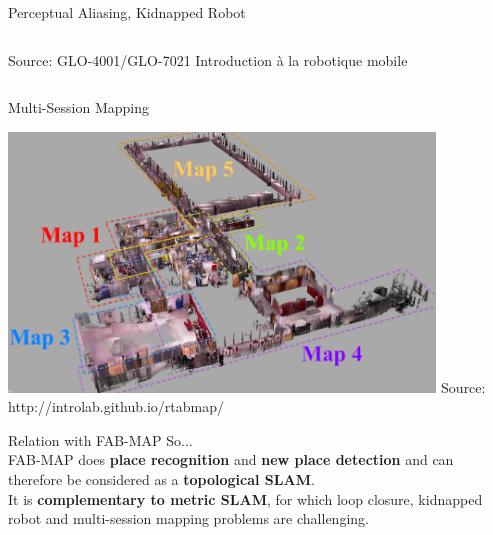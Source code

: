 \begin{frame}{Perceptual Aliasing, Kidnapped Robot}
\begin{columns}
\begin{column}{0.5\textwidth}
\begin{center}
                {\tiny Source: GLO-4001/GLO-7021 Introduction à la robotique mobile}
            \end{center}
        \end{column}
    \end{columns}
\end{frame}

\begin{frame}{Multi-Session Mapping}
    \begin{center}
        \includegraphics[width=0.85\textwidth]{./media/multi-session.png}\newline
        {\tiny Source: http://introlab.github.io/rtabmap/}
    \end{center}
\end{frame}

\begin{frame}{Relation with FAB-MAP}
    So...\newline\\
    FAB-MAP does \textbf{place recognition} and \textbf{new place detection} and can therefore be considered as a \textbf{topological SLAM}.\newline\\
    It is \textbf{complementary to metric SLAM}, for which loop closure, kidnapped robot and multi-session mapping problems are challenging.
\end{frame}

